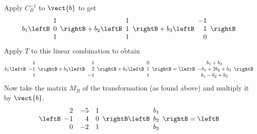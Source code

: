 \begin{solution}
Apply $C^{-1}_{B}$ to $\vect{b}$ to get 
\begin{equation*}
b_1\leftB 
\begin{array}{r}
1 \\
0 \\
1
\end{array}
\rightB + b_2\leftB 
\begin{array}{r}
1 \\
1 \\
1
\end{array}
\rightB + b_3\leftB 
\begin{array}{r}
-1 \\
1 \\
0
\end{array}
\rightB 
\end{equation*}
Apply $T$ to this linear combination to obtain 
\begin{equation*}
b_1\leftB 
\begin{array}{r}
1 \\ 
-1 \\ 
1
\end{array}
\rightB + b_2\leftB 
\begin{array}{r}
1 \\ 
2 \\ 
-1
\end{array}
\rightB + b_3\leftB 
\begin{array}{r}
0 \\ 
1 \\ 
1
\end{array}
\rightB =\leftB 
\begin{array}{c}
b_1+b_2 \\ 
-b_1 + 2b_2+ b_3 \\ 
b_1-b_2+b_3
\end{array}
\rightB
\end{equation*}
Now take the matrix $M_{B}$ of the transformation (as found above) and multiply it by $\vect{b}$. 
\begin{equation*}
\leftB 
\begin{array}{rrr}
2 & -5 & 1 \\ 
-1 & 4 & 0 \\ 
0 & -2 & 1
\end{array}
\rightB \leftB 
\begin{array}{c}
b_1 \\ 
b_2 \\ 
b_3
\end{array}
\rightB =\leftB 
\begin{array}{c}

\end{array}
\end{equation*}
\end{solution}
